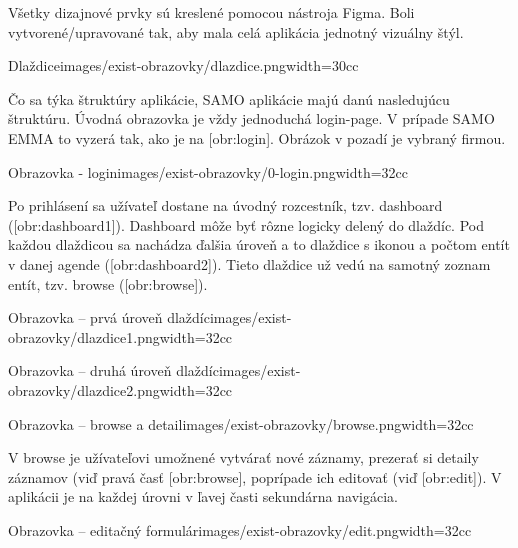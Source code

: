 Všetky dizajnové prvky sú kreslené pomocou nástroja Figma. Boli vytvorené/upravované tak, aby mala celá aplikácia jednotný vizuálny štýl. 

{Dlaždice}{images/exist-obrazovky/dlazdice.png}{width=30cc} 

Čo sa týka štruktúry aplikácie, SAMO aplikácie majú danú nasledujúcu štruktúru.  Úvodná obrazovka je vždy jednoduchá login-page. V prípade SAMO EMMA to vyzerá tak, ako je na [obr:login]. Obrázok v pozadí je vybraný firmou.

{Obrazovka - login}{images/exist-obrazovky/0-login.png}{width=32cc} 

Po prihlásení sa užívateľ dostane na úvodný rozcestník, tzv. dashboard ([obr:dashboard1]). Dashboard môže byť rôzne logicky delený do dlaždíc. Pod každou dlaždicou sa nachádza ďalšia úroveň a to dlaždice s ikonou a počtom entít v danej agende ([obr:dashboard2]). Tieto dlaždice už vedú na samotný zoznam entít, tzv. browse ([obr:browse]).

{Obrazovka -- prvá úroveň dlaždíc}{images/exist-obrazovky/dlazdice1.png}{width=32cc} 

{Obrazovka -- druhá úroveň dlaždíc}{images/exist-obrazovky/dlazdice2.png}{width=32cc} 

{Obrazovka -- browse a detail}{images/exist-obrazovky/browse.png}{width=32cc} 

V browse je užívateľovi umožnené vytvárať nové záznamy, prezerať si detaily záznamov (viď pravá časť [obr:browse], poprípade ich editovať (viď [obr:edit]). V aplikácii je na každej úrovni v ľavej časti sekundárna navigácia.

{Obrazovka -- editačný formulár}{images/exist-obrazovky/edit.png}{width=32cc} 


